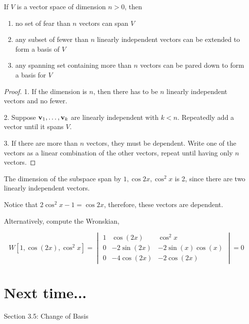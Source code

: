\begin{theorem}
If $V$ is a vector space of dimension $n>0$, then 
\begin{enumerate}
	\item no set of fear than $n$ vectors can span $V$
	\item any subset of fewer than $n$ linearly independent vectors can be extended to form a basis of $V$
	\item any spanning set containing more than $n$ vectors can be pared down to form a basis for $V$
\end{enumerate}



\begin{proof}
	1.  If the dimension is $n$, then there has to be $n$ linearly independent vectors and no fewer.
	
	2.  Suppose ${\bf v}_1, \dots , {\bf v}_k$ are linearly independent with $k<n$.  Repeatedly add a vector until it spans $V$.  
	
	3.  If there are more than $n$ vectors, they must be dependent.  Write one of the vectors as a linear combination of the other vectors, repeat until having only $n$ vectors.
\end{proof}
\end{theorem}











 

\begin{example}
	The dimension of the subspace span by $1, \cos 2x, \cos^2 x$ is 2, since there are two linearly independent vectors.  
	
	Notice that $2\cos^2 x - 1 = \cos 2x$, therefore, these vectors are dependent.
	
	Alternatively, compute the Wronskian, 
	
	\[   
	W[1, \cos(2x), \cos^2 x]=  
	\begin{vmatrix} 
	1	&	\cos(2x) 	&	\cos^2 x	 \\
	0	&	-2\sin(2x) 	&	-2\sin(x) \cos (x)\\
	0	&	-4\cos(2x) 	&      -2\cos (2x)		
	\end{vmatrix} = 0
		  \]  
	
	
\end{example}






\section*{Next time...}
Section 3.5: Change of Basis

